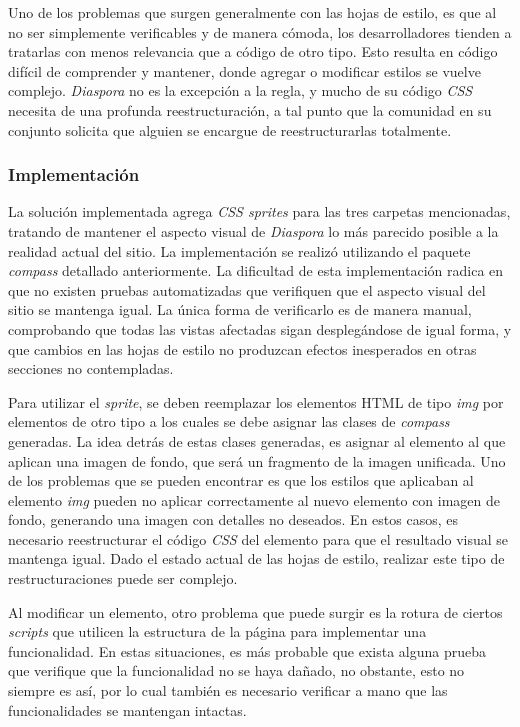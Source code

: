 Uno de los problemas que surgen generalmente con las hojas de estilo, es que al no ser simplemente verificables y de manera cómoda, los desarrolladores tienden a tratarlas con
menos relevancia que a código de otro tipo. Esto resulta en código difícil de comprender y mantener, donde agregar o modificar estilos se vuelve complejo. \emph{Diaspora} no es la
excepción a la regla, y mucho de su código \emph{CSS} necesita de una profunda reestructuración, a tal punto que la comunidad en su conjunto solicita que alguien se encargue de 
reestructurarlas totalmente.

\subsubsection{Implementación}

La solución implementada agrega \emph{CSS sprites} para las tres carpetas mencionadas, tratando de mantener el aspecto visual de \emph{Diaspora} lo más parecido posible a la 
realidad actual del sitio. La implementación se realizó utilizando el paquete \emph{compass} detallado anteriormente. La dificultad de esta implementación radica en que no existen 
pruebas automatizadas que verifiquen que el aspecto visual del sitio se mantenga igual. La única forma de verificarlo es de manera manual, comprobando que todas las vistas 
afectadas sigan desplegándose de igual forma, y que cambios en las hojas de estilo no produzcan efectos inesperados en otras secciones no contempladas. 

Para utilizar el \emph{sprite}, se deben reemplazar los elementos HTML de tipo \emph{img} por elementos de otro tipo a los cuales se debe asignar las clases de \emph{compass}
generadas. La idea detrás de estas clases generadas, es asignar al elemento al que aplican una imagen de fondo, que será un fragmento de la imagen unificada. Uno de los problemas 
que se pueden encontrar es que los estilos que aplicaban al elemento \emph{img} pueden no aplicar correctamente al nuevo elemento con imagen de fondo, generando una imagen 
con detalles no deseados.
En estos casos, es necesario reestructurar el código \emph{CSS} del elemento para que el resultado visual se mantenga igual. Dado el estado actual de las hojas de estilo, realizar
este tipo de restructuraciones puede ser complejo.

Al modificar un elemento, otro problema que puede surgir es la rotura de ciertos \emph{scripts} que utilicen la estructura de la página para implementar una funcionalidad. En estas
situaciones, es más probable que exista alguna prueba que verifique que la funcionalidad no se haya dañado, no obstante, esto no siempre es así, por lo cual también es necesario
verificar a mano que las funcionalidades se mantengan intactas.

